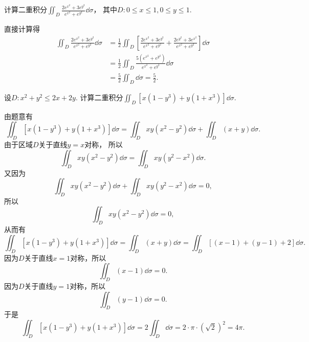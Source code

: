 \begin{example}
计算二重积分\(\iint_D \frac{2 e^{x^2} + 3 e^{y^2}}{e^{x^2} + e^{y^2}} \dd{\sigma}\)，
其中\(D: 0 \leq x \leq 1, 0 \leq y \leq 1\).
\begin{solution}
直接计算得\begin{align*}
	\iint_D \frac{2 e^{x^2} + 3 e^{y^2}}{e^{x^2} + e^{y^2}} \dd{\sigma}
	&= \frac12 \iint_D \left[
		\frac{2 e^{x^2} + 3 e^{y^2}}{e^{x^2} + e^{y^2}}
		+ \frac{2 e^{y^2} + 3 e^{x^2}}{e^{x^2} + e^{y^2}}
	\right] \dd{\sigma} \\
	&= \frac12 \iint_D \frac{5 (e^{x^2} + e^{y^2})}{e^{x^2} + e^{y^2}} \dd{\sigma} \\
	&= \frac52 \iint_D \dd{\sigma}
	= \frac52.
\end{align*}
\end{solution}
\end{example}

\begin{example}
设\(D: x^2+y^2\leq2x+2y\).
计算二重积分\(\iint_D [x(1-y^3)+y(1+x^3)] \dd{\sigma}\).
\begin{solution}
由题意有\begin{equation*}
	\iint_D [x(1-y^3)+y(1+x^3)] \dd{\sigma}
	= \iint_D xy(x^2-y^2) \dd{\sigma}
	+ \iint_D (x+y) \dd{\sigma}.
\end{equation*}
由于区域\(D\)关于直线\(y=x\)对称，
所以\begin{equation*}
	\iint_D xy(x^2-y^2) \dd{\sigma}
	= \iint_D xy(y^2-x^2) \dd{\sigma}.
\end{equation*}
又因为\begin{equation*}
	\iint_D xy(x^2-y^2) \dd{\sigma}
	+ \iint_D xy(y^2-x^2) \dd{\sigma}
	= 0,
\end{equation*}
所以\begin{equation*}
	\iint_D xy(x^2-y^2) \dd{\sigma}
	= 0,
\end{equation*}
从而有\begin{equation*}
	\iint_D [x(1-y^3)+y(1+x^3)] \dd{\sigma}
	= \iint_D (x+y) \dd{\sigma}
	= \iint_D [(x-1)+(y-1)+2] \dd{\sigma}.
\end{equation*}
因为\(D\)关于直线\(x=1\)对称，所以\begin{equation*}
	\iint_D (x-1) \dd{\sigma}
	= 0.
\end{equation*}
因为\(D\)关于直线\(y=1\)对称，所以\begin{equation*}
	\iint_D (y-1) \dd{\sigma}
	= 0.
\end{equation*}
于是\begin{equation*}
	\iint_D [x(1-y^3)+y(1+x^3)] \dd{\sigma}
	= 2 \iint_D \dd{\sigma}
	= 2 \cdot \pi \cdot (\sqrt2)^2
	= 4\pi.
\end{equation*}
\end{solution}
\end{example}

